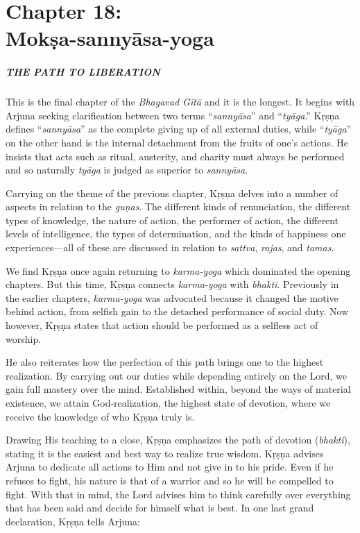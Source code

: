 \chapter{Chapter 18: \\Mokṣa-sannyāsa-yoga}\label{chap-moksa-sannyasa-yoga}

\paragraph*{\MakeUppercase{The Path to Liberation}}

This is the final chapter of the \textit{Bhagavad Gītā} and it is the longest. It begins with Arjuna seeking clarification between two terms \enquote{\textit{sannyāsa}} and \enquote{\textit{tyāga}.} Kṛṣṇa defines \enquote{\textit{sannyāsa}} as the complete giving up of all external duties, while \enquote{\textit{tyāga}} on the other hand is the internal detachment from the fruits of one’s actions. He insists that acts such as ritual, austerity, and charity must always be performed and so naturally \textit{tyāga} is judged as superior to \textit{sannyāsa}.

Carrying on the theme of the previous chapter, Kṛṣṇa delves into a number of aspects in relation to the \textit{guṇas}. The different kinds of renunciation, the different types of knowledge, the nature of action, the performer of action, the different levels of intelligence, the types of determination, and the kinds of happiness one experiences---all of these are discussed in relation to \textit{sattva}, \textit{rajas}, and \textit{tamas}.

We find Kṛṣṇa once again returning to \textit{karma-yoga} which dominated the opening chapters. But this time, Kṛṣṇa connects \textit{karma-yoga} with \textit{bhakti}. Previously in the earlier chapters, \textit{karma-yoga} was advocated because it changed the motive behind action, from selfish gain to the detached performance of social duty. Now however, Kṛṣṇa states that action should be performed as a selfless act of worship.

He also reiterates how the perfection of this path brings one to the highest realization. By carrying out our duties while depending entirely on the Lord, we gain full mastery over the mind. Established within, beyond the ways of material existence, we attain God-realization, the highest state of devotion, where we receive the knowledge of who Kṛṣṇa truly is.

Drawing His teaching to a close, Kṛṣṇa emphasizes the path of devotion (\textit{bhakti}), stating it is the easiest and best way to realize true wisdom. Kṛṣṇa advises Arjuna to dedicate all actions to Him and not give in to his pride. Even if he refuses to fight, his nature is that of a warrior and so he will be compelled to fight. With that in mind, the Lord advises him to think carefully over everything that has been said and decide for himself what is best. In one last grand declaration, Kṛṣṇa tells Arjuna:

